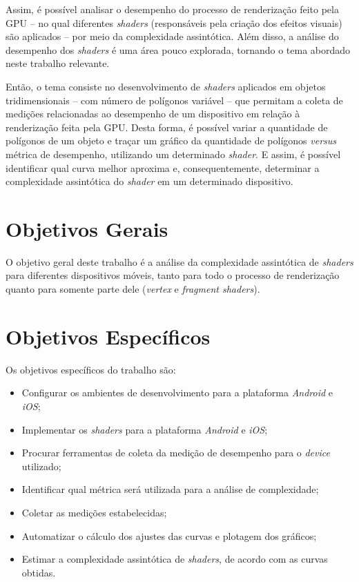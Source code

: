 	Assim, é possível analisar o desempenho do processo de renderização feito pela GPU -- no qual diferentes \textit{shaders} (responsáveis pela criação dos efeitos visuais) são aplicados -- por meio da complexidade assintótica. Além disso, a análise do desempenho dos \textit{shaders} é uma área pouco explorada, tornando o tema abordado neste trabalho relevante. 

	Então, o tema consiste no desenvolvimento de \textit{shaders} aplicados em objetos tridimensionais -- com número de polígonos variável -- que permitam a coleta de medições relacionadas ao desempenho de um dispositivo em relação à renderização feita pela GPU. Desta forma, é possível variar a quantidade de polígonos de um objeto e traçar um gráfico da quantidade de polígonos \textit{versus} métrica de desempenho, utilizando um determinado \textit{shader}. E assim, é possível identificar qual curva melhor aproxima e, consequentemente, determinar a complexidade assintótica do \textit{shader} em um determinado dispositivo.  

\section{Objetivos Gerais}

O objetivo geral deste trabalho é a análise da complexidade assintótica de \textit{shaders} para diferentes dispositivos móveis, tanto para todo o processo de renderização quanto para somente parte dele (\textit{vertex} e \textit{fragment shaders}).

\section{Objetivos Específicos}

Os objetivos específicos do trabalho são:

\begin{itemize}
 \item Configurar os ambientes de desenvolvimento para a plataforma \textit{Android} e \textit{iOS};
 \item Implementar os \textit{shaders} para a plataforma \textit{Android} e \textit{iOS};
\item Procurar ferramentas de coleta da medição de desempenho para o \textit{device} utilizado;
\item Identificar qual métrica será utilizada para a análise de complexidade;
\item Coletar as medições estabelecidas;
\item Automatizar o cálculo dos ajustes das curvas e plotagem dos gráficos;
\item Estimar a complexidade assintótica de \textit{shaders}, de acordo com as curvas obtidas.
\end{itemize}

